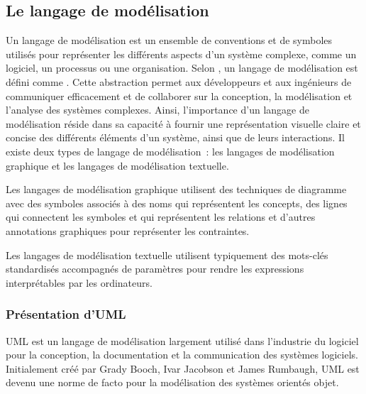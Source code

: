 \subsection{Le langage de modélisation}
Un langage de modélisation est un ensemble de conventions et de symboles utilisés pour représenter
les différents aspects d’un système complexe, comme un logiciel, un processus ou une
organisation. Selon \textcite{weilkiens2011systems}, un langage de modélisation est défini comme
.
Cette abstraction permet aux développeurs et aux ingénieurs de
communiquer efficacement et de collaborer sur la conception, la modélisation et l’analyse des
systèmes complexes. Ainsi, l’importance d'un langage de modélisation réside dans sa capacité à fournir une représentation
visuelle claire et concise des différents éléments d'un système, ainsi que de leurs interactions.
Il existe deux types de langage de modélisation : les langages de modélisation graphique
et les langages de modélisation textuelle.

Les langages de modélisation graphique utilisent des techniques de diagramme
avec des symboles associés à des noms qui représentent les concepts, des lignes
qui connectent les symboles et qui représentent les relations et d’autres
annotations graphiques pour représenter les contraintes.

Les langages de modélisation textuelle utilisent typiquement des mots-clés
standardisés accompagnés de paramètres pour rendre les expressions interprétables
par les ordinateurs.



\subsubsection{Présentation d'UML}
\ac{UML} est un langage de modélisation largement utilisé dans l’industrie
du logiciel pour la conception, la documentation et la communication des systèmes logiciels.
Initialement créé par Grady Booch, Ivar Jacobson et James Rumbaugh, UML est devenu une norme
de facto pour la modélisation des systèmes orientés objet.

